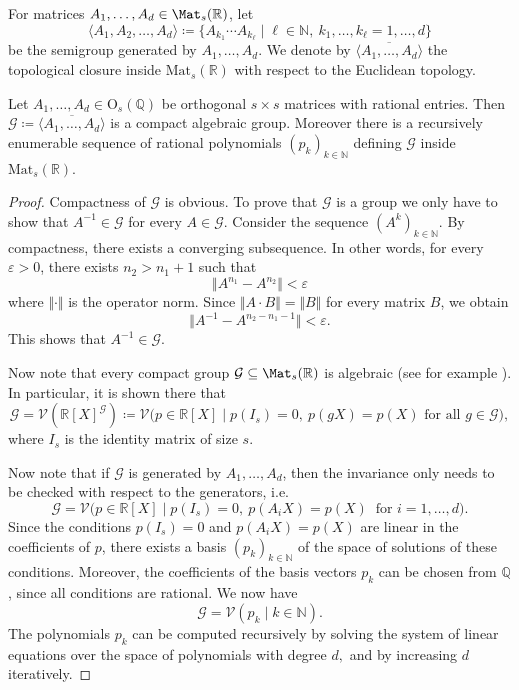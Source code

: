 For matrices $A_1, \ldots, A_d \in \Mat_{s}(\mathbb{R})$, let
$$\langle A_1, A_2, \ldots, A_d \rangle \coloneqq \big\{A_{k_1} \cdots A_{k_\ell}\mid \ell \in \mathbb{N}, \ k_1, \ldots, k_\ell = 1, \ldots, d\big\}$$
be the semigroup generated by $A_1, \ldots, A_d$. We denote by $\overline{\langle A_1, \ldots, A_d \rangle}$ the topological closure inside $\mathrm{Mat}_s(\mathbb R)$ with respect to the Euclidean topology. 


\begin{lemma}\label{lem:compactAlgebraic}
Let $A_1, \ldots, A_d \in \mathrm{O}_s(\mathbb{Q})$ be orthogonal $s \times s$ matrices with rational entries. Then $\mathcal{G} \coloneqq \overline{\langle A_1, \ldots, A_d \rangle}$ is a compact algebraic group.
Moreover there is a recursively enumerable sequence of rational polynomials $(p_k)_{k \in \mathbb{N}}$ defining $\mathcal{G}$ inside $\mathrm{Mat}_s(\mathbb R)$.

\end{lemma}
\begin{proof}
Compactness of $\mathcal{G}$ is obvious. To prove that $\mathcal{G}$ is a group we only have to show that $A^{-1} \in \mathcal{G}$ for every $A \in \mathcal{G}$. Consider the sequence $(A^k)_{k \in \mathbb{N}}$. By compactness, there exists a converging subsequence. In other words, for every $\varepsilon > 0$, there exists $n_2 > n_1 +1$ such that
$$\Vert A^{n_1} - A^{n_2} \Vert < \varepsilon$$
where $\Vert \cdot \Vert$ is the operator norm. Since $\Vert A \cdot B \Vert = \Vert B \Vert$ for every matrix $B$, we obtain
$$\Vert A^{-1} -  A^{n_2 - n_1 - 1} \Vert < \varepsilon.$$
This shows that $A^{-1} \in \mathcal{G}$.

Now note that every compact group $\mathcal{G} \subseteq \Mat_s(\mathbb{R})$ is algebraic (see for example \cite[Chapter 3, Section 4.4]{On90}). In particular, it is shown there that
$$\mathcal{G} = \mathcal{V}\left(\mathbb{R}[X]^\mathcal{G} \right) \coloneqq \mathcal{V}\Big(p \in \mathbb{R}[X]\mid  p(I_s) = 0, \ p(gX) = p(X) \text{ for all } g \in \mathcal{G} \Big),$$
where $I_s$ is the identity matrix of size $s$.

Now  note that if $\mathcal{G}$ is generated by $A_1, \ldots, A_d$, then the invariance only needs to be checked with respect to the generators, i.e.\
$$\mathcal{G} = \mathcal{V}\Big(p \in \mathbb{R}[X]\mid p(I_s) = 0, \ p(A_i X) = p(X) \ \text{ for } i=1, \ldots,d \Big).$$
Since the conditions $p(I_s) = 0$ and $p(A_i X) = p(X)$ are linear in the coefficients of $p$, there exists a basis $(p_k)_{k \in \mathbb{N}}$ of the space of solutions of these conditions. Moreover, the coefficients of the basis vectors $p_k$ can be chosen from $\mathbb{Q}$, since all conditions are rational. We now have
$$\mathcal{G} = \mathcal{V}(p_k\mid  k \in \mathbb{N}).$$
The polynomials $p_k$ can be computed recursively by solving the system of linear equations over the space of polynomials with degree $d,$ and by increasing $d$ iteratively. 
\end{proof}

